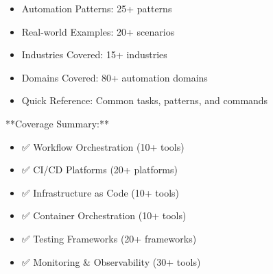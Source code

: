 \documentclass[11pt,a4paper]{article}
\begin{document}
\begin{itemize}
\item Automation Patterns: 25+ patterns
\end{itemize}

\begin{itemize}
\item Real-world Examples: 20+ scenarios
\end{itemize}

\begin{itemize}
\item Industries Covered: 15+ industries
\end{itemize}

\begin{itemize}
\item Domains Covered: 80+ automation domains
\end{itemize}

\begin{itemize}
\item Quick Reference: Common tasks, patterns, and commands
\end{itemize}

**Coverage Summary:**

\begin{itemize}
\item ✅ Workflow Orchestration (10+ tools)
\end{itemize}

\begin{itemize}
\item ✅ CI/CD Platforms (20+ platforms)
\end{itemize}

\begin{itemize}
\item ✅ Infrastructure as Code (10+ tools)
\end{itemize}

\begin{itemize}
\item ✅ Container Orchestration (10+ tools)
\end{itemize}

\begin{itemize}
\item ✅ Testing Frameworks (20+ frameworks)
\end{itemize}

\begin{itemize}
\item ✅ Monitoring & Observability (30+ tools)
\end{itemize}
\end{document}
